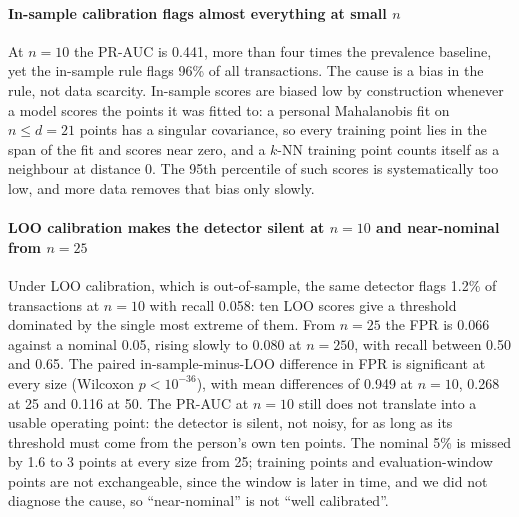\paragraph{In-sample calibration flags almost everything at small $n$}
At $n=10$ the PR-AUC is 0.441, more than four times the prevalence baseline, yet the in-sample rule flags 96\% of all transactions. The cause is a bias in the rule, not data scarcity. In-sample scores are biased low by construction whenever a model scores the points it was fitted to: a personal Mahalanobis fit on $n\le d=21$ points has a singular covariance, so every training point lies in the span of the fit and scores near zero, and a $k$-NN training point counts itself as a neighbour at distance 0. The 95th percentile of such scores is systematically too low, and more data removes that bias only slowly.

\paragraph{LOO calibration makes the detector silent at $n=10$ and near-nominal from $n=25$}
Under LOO calibration, which is out-of-sample, the same detector flags 1.2\% of transactions at $n=10$ with recall 0.058: ten LOO scores give a threshold dominated by the single most extreme of them. From $n=25$ the FPR is 0.066 against a nominal 0.05, rising slowly to 0.080 at $n=250$, with recall between 0.50 and 0.65. The paired in-sample-minus-LOO difference in FPR is significant at every size (Wilcoxon $p<10^{-36}$), with mean differences of 0.949 at $n=10$, 0.268 at 25 and 0.116 at 50. The PR-AUC at $n=10$ still does not translate into a usable operating point: the detector is silent, not noisy, for as long as its threshold must come from the person's own ten points. The nominal 5\% is missed by 1.6 to 3 points at every size from 25; training points and evaluation-window points are not exchangeable, since the window is later in time, and we did not diagnose the cause, so ``near-nominal'' is not ``well calibrated''.

